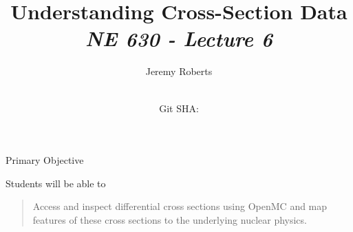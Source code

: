 \documentclass[aspectratio=1610]{beamer}
\title{Understanding Cross-Section Data \\
       {\small\it NE 630 - Lecture 6}}
\date{ \\ {\footnotesize Git SHA: }}
\author{Jeremy Roberts}
\begin{document}
\begin{frame}
\titlepage
\end{frame}
 
 
\begin{frame}{Primary Objective}

Students will be able to 

\vfill


\begin{quote}
\textcolor{wcprimary}{Access and inspect differential cross sections using OpenMC and map features of these cross sections to the underlying nuclear physics.}
\end{quote}

\vfill 


\end{frame}
\end{document}
